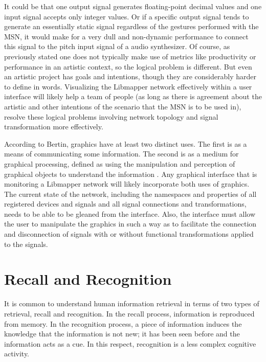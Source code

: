 It could be that one output signal generates floating-point decimal values and one input signal accepts only integer values. Or if a specific output signal tends to generate an essentially static signal regardless of the gestures performed with the MSN, it would make for a very dull and non-dynamic performance to connect this signal to the pitch input signal of a audio synthesizer. Of course, as previously stated one does not typically make use of metrics like productivity or performance in an artistic context, so the logical problem is different. But even an artistic project has goals and intentions, though they are considerably harder to define in words. Visualizing the Libmapper network effectively within a user interface will likely help a team of people (as long as there is agreement about the artistic and other intentions of the scenario that the MSN is to be used in), resolve these logical problems involving network topology and signal transformation more effectively. 

According to Bertin, graphics have at least two distinct uses. The first is as a means of communicating some information. The second is as a medium for graphical processing, defined as using the manipulation and perception of graphical objects to understand the information \cite{card1997}. Any graphical interface that is monitoring a Libmapper network will likely incorporate both uses of graphics. The current state of the network, including the namespaces and properties of all registered devices and signals and all signal connections and transformations, needs to be able to be gleaned from the interface. Also, the interface must allow the user to manipulate the graphics in such a way as to facilitate the connection and disconnection of signals with or without functional transformations applied to the signals.

\begin{comment}
The Structure of the Information Visualization Design Space, Section 2 
controlled vs. automatic processing
connection

Visual Information Seeking: Tight Coupling of Dynamic Query Filters with Starfield Displays
\end{comment}
\section{Recall and Recognition}

It is common to understand human information retrieval in terms of two types of retrieval, recall and recognition. In the recall process, information is reproduced from memory. In the recognition process, a piece of information induces the knowledge that the information is not new; it has been seen before and the information acts as a cue. In this respect, recognition is a less complex cognitive activity.

